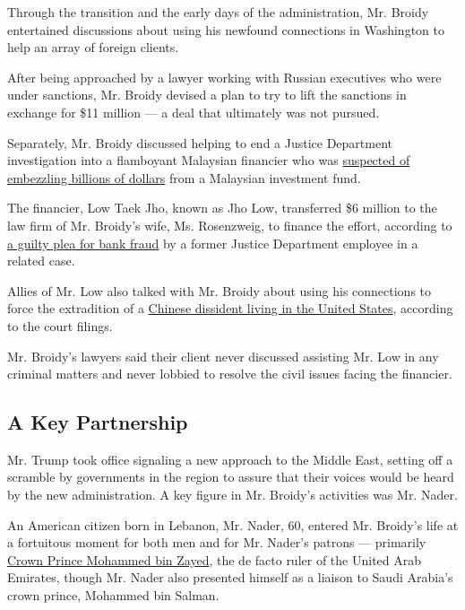 Through the transition and the early days of the administration, Mr.
Broidy entertained discussions about using his newfound connections in
Washington to help an array of foreign clients.

After being approached by a lawyer working with Russian executives who
were under sanctions, Mr. Broidy devised a plan to try to lift the
sanctions in exchange for \$11 million --- a deal that ultimately was
not pursued.

Separately, Mr. Broidy discussed helping to end a Justice Department
investigation into a flamboyant Malaysian financier who was
\href{https://www.nytimes.com/2018/08/24/world/asia/jho-low-malaysia-1mdb.html}{suspected
of embezzling billions of dollars} from a Malaysian investment fund.

The financier, Low Taek Jho, known as Jho Low, transferred \$6 million
to the law firm of Mr. Broidy's wife, Ms. Rosenzweig, to finance the
effort, according to
\href{https://www.nytimes.com/2018/11/30/us/politics/broidy-trump-foreign-money.html}{a
guilty plea for bank fraud} by a former Justice Department employee in a
related case.

Allies of Mr. Low also talked with Mr. Broidy about using his
connections to force the extradition of a
\href{https://www.nytimes.com/2018/01/10/magazine/the-mystery-of-the-exiled-billionaire-whistleblower.html}{Chinese
dissident living in the United States}, according to the court filings.

Mr. Broidy's lawyers said their client never discussed assisting Mr. Low
in any criminal matters and never lobbied to resolve the civil issues
facing the financier.

\hypertarget{a-key-partnership}{%
\subsection{A Key Partnership}\label{a-key-partnership}}

Mr. Trump took office signaling a new approach to the Middle East,
setting off a scramble by governments in the region to assure that their
voices would be heard by the new administration. A key figure in Mr.
Broidy's activities was Mr. Nader.

An American citizen born in Lebanon, Mr. Nader, 60, entered Mr. Broidy's
life at a fortuitous moment for both men and for Mr. Nader's patrons ---
primarily
\href{https://www.nytimes.com/2019/06/02/world/middleeast/crown-prince-mohammed-bin-zayed.html}{Crown
Prince Mohammed bin Zayed}, the de facto ruler of the United Arab
Emirates, though Mr. Nader also presented himself as a liaison to Saudi
Arabia's crown prince, Mohammed bin Salman.

